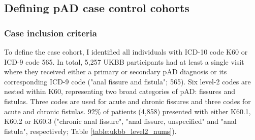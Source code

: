 \subsection{Defining pAD case control cohorts}


\subsubsection{Case inclusion criteria}
To define the case cohort, I identified all individuals with ICD-10 code K60 or ICD-9 code 565. In total, 5,257 UKBB participants had at least a single visit where they received either a primary or secondary pAD diagnosis or its corresponding ICD-9 code ("anal fissure and fistula"; 565). Six level-2 codes are nested within K60, representing two broad categories of pAD: fissures and fistulas. Three codes are used for acute and chronic fissures and three codes for acute and chronic fistulas. 92\% of patients (4,858) presented with either K60.1, K60.2 or K60.3 ("chronic anal fissure", "anal fissure, unspecified" and "anal fistula", respectively; Table \ref{table:ukbb_level2_nums}).



